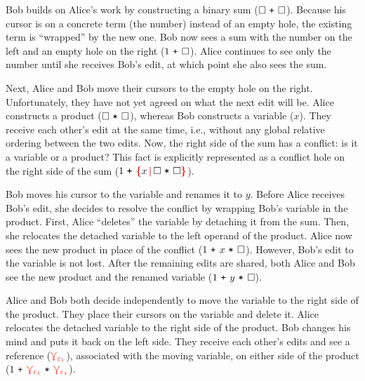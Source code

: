 \documentclass[nonacm, acmsmall, screen, review]{acmart}
\newcommand{\e}{\varepsilon}
\newcommand{\id}[1]{\textcolor{gray}{\ensuremath{#1}}}
\newcommand{\eid}[2]{{#2}^{\id{#1}}}
\newcommand{\hole}{\ensuremath{\square}} %
\newcommand{\conflictHole}[1]{%
{\noexpandarg\StrSubstitute{#1}{,}{\textcolor{red}{\,\textbf{|}\,}}[\myargs]%
{\textcolor{red}{\textbf{\{}}\myargs\textcolor{red}{\textbf{\}}}}}}%
\newcommand{\ePlus}[3]{#2~\eid{#1}{\texttt{+}}~#3}
\newcommand{\eTimes}[3]{#2~\eid{#1}{\texttt{*}}~#3}
\newcommand{\multiVertex}[1]{\textcolor{red}{\ensuremath{\curlyveedownarrow_{#1}}}}
\begin{document}
Bob builds on Alice's work by constructing a binary sum ($\ePlus{}{\hole}{\hole}$).
Because his cursor is on a concrete term (the number) instead of an empty hole, the existing term is ``wrapped'' by the new one.
Bob now sees a sum with the number on the left and an empty hole on the right ($\ePlus{}{1}{\hole}$).
Alice continues to see only the number until she receives Bob's edit,
at which point she also sees the sum.

Next, Alice and Bob move their cursors to the empty hole on the right.
Unfortunately, they have not yet agreed on what the next edit will be.
Alice constructs a product ($\eTimes{}{\hole}{\hole}$),
whereas Bob constructs a variable ($x$).
They receive each other's edit at the same time, i.e., without any global relative ordering between the two edits.
Now, the right side of the sum has a conflict: is it a variable or a product?
This fact is explicitly represented as a conflict hole on the right side of the sum ($\ePlus{}{1}{\conflictHole{x, \eTimes{}{\hole}{\hole}}}$).

Bob moves his cursor to the variable and renames it to $y$.
Before Alice receives Bob's edit,
she decides to resolve the conflict by wrapping Bob's variable in the product.
First, Alice ``deletes'' the variable by detaching it from the sum.
Then, she relocates the detached variable to the left operand of the product.
Alice now sees the new product in place of the conflict ($\ePlus{}{1}{\eTimes{}{x}{\hole}}$).
However, Bob's edit to the variable is not lost.
After the remaining edits are shared,
both Alice and Bob see the new product and the renamed variable ($\ePlus{}{1}{\eTimes{}{y}{\hole}}$).

Alice and Bob both decide independently to move the variable to the right side of the product.
They place their cursors on the variable and delete it.
Alice relocates the detached variable to the right side of the product.
Bob changes his mind and puts it back on the left side.
They receive each other's edits and see a reference ($\multiVertex{\e_1}$), associated with the moving variable, on either side of the product ($\ePlus{}{1}{\eTimes{}{\multiVertex{\e_1}}{\multiVertex{\e_1}}}$).
\end{document}
